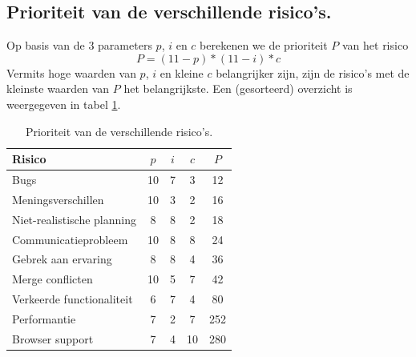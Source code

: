\subsection{Prioriteit van de verschillende risico's.} \label{sec:riskPriority}
Op basis van de 3 parameters $p$, $i$ en $c$ berekenen we de prioriteit $P$ van het risico \cite{SoftwareEngineeringAModernApproach}
$$ P = (11 - p)*(11 - i)*c$$
Vermits hoge waarden van $p$, $i$ en kleine $c$ belangrijker zijn, zijn de risico's met de kleinste waarden van $P$ het belangrijkste. Een (gesorteerd) overzicht is weergegeven in tabel \ref{tab:riskPriorityTabel}.
\begin{table} [H]
	\centering
	\caption{Prioriteit van de verschillende risico's.}
	\begin{tabular} {l|ccc|c}
		Risico & $p$ & $i$ & $c$ & $P$ \\
		\hline
		Bugs						& 10	& 7 	& 3		& 12 \\
		Meningsverschillen 			& 10	& 3		& 2		& 16 \\
		Niet-realistische planning 	& 8 	& 8 	& 2 	& 18 \\
		Communicatieprobleem		& 10	& 8		& 8		& 24 \\ 
		Gebrek aan ervaring 		& 8 	& 8 	& 4 	& 36 \\
		Merge conflicten			& 10	& 5		& 7		& 42 \\
		Verkeerde functionaliteit 	& 6 	& 7 	& 4 	& 80 \\
		Performantie 				& 7 	& 2 	& 7 	& 252 \\
		Browser support				& 7 	& 4 	& 10 	& 280
	\end{tabular}
	\label{tab:riskPriorityTabel}
\end{table}

